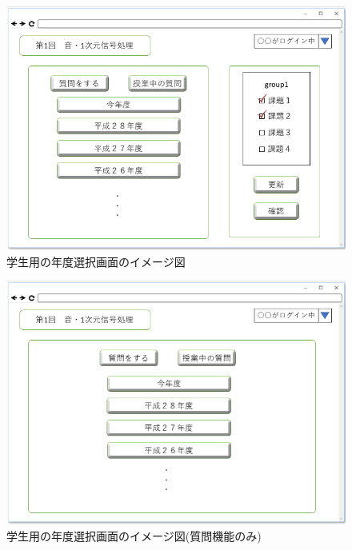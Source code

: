 \begin{figure}[phtbp]
  \begin{center}
    \includegraphics[width=1\linewidth,clip]{./img/30.png}
    \caption{学生用の年度選択画面のイメージ図}\label{fig:30}
  \end{center}
\end{figure}

\begin{figure}[phtbp]
  \begin{center}
    \includegraphics[width=1\linewidth,clip]{./img/31.png}
    \caption{学生用の年度選択画面のイメージ図(質問機能のみ)}\label{fig:31}
  \end{center}
\end{figure}

\newpage

